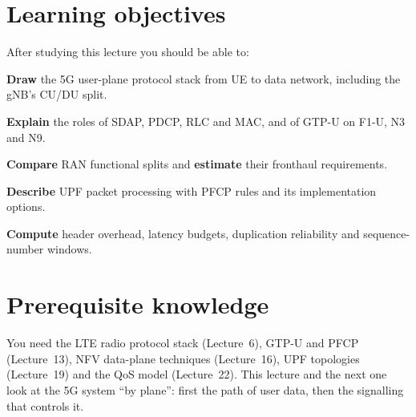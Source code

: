 \documentclass[11pt,a4paper]{article}
\begin{document}
\ACNcover

\section{Learning objectives}
After studying this lecture you should be able to:
\begin{objectives}
  \item \textbf{Draw} the 5G user-plane protocol stack from UE to data network, including the gNB's CU/DU split.
  \item \textbf{Explain} the roles of SDAP, PDCP, RLC and MAC, and of GTP-U on F1-U, N3 and N9.
  \item \textbf{Compare} RAN functional splits and \textbf{estimate} their fronthaul requirements.
  \item \textbf{Describe} UPF packet processing with PFCP rules and its implementation options.
  \item \textbf{Compute} header overhead, latency budgets, duplication reliability and sequence-number windows.
\end{objectives}

\section{Prerequisite knowledge}
You need the LTE radio protocol stack (Lecture~6), GTP-U and PFCP (Lecture~13), NFV data-plane techniques (Lecture~16), UPF topologies
(Lecture~19) and the QoS model (Lecture~22). This lecture and the next one look at the 5G system ``by plane'': first the path of user
data, then the signalling that controls it.
\end{document}
